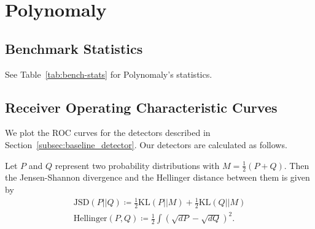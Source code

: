 \section{Polynomaly}

\subsection{Benchmark Statistics}
\label{app:benchmark_statistics}
See Table~\ref{tab:bench-stats} for Polynomaly's statistics. 
\begin{table}[tbp]

\caption{Benchmark statistics. We average over 5 rollouts in traffic and 32 rollouts in COVID.}
\label{tab:bench-stats}%
\end{table}%

\subsection{Receiver Operating Characteristic Curves} \label{app:roc}
We plot the ROC curves for the detectors described in Section~\ref{subsec:baseline_detector}. Our detectors are calculated as follows.

Let $P$ and $Q$ represent two probability distributions with $M = \frac{1}{2}(P + Q)$. Then the Jensen-Shannon divergence and the Hellinger distance between them is given by \begin{equation}\begin{aligned}\label{eqn:distance_metrics} \text{JSD}(P\vert\vert Q) \coloneqq \frac{1}{2} \text{KL}(P\vert\vert M) + \frac{1}{2}\text{KL}(Q \vert\vert M) \\ \text{Hellinger}(P, Q) \coloneqq \frac{1}{2} \int \left( \sqrt{dP} - \sqrt{dQ}\right)^2.
\end{aligned}\end{equation}

